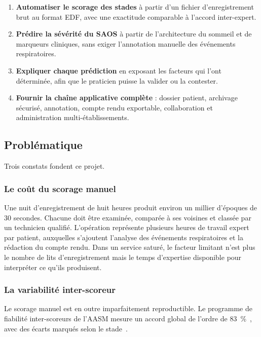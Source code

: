 \begin{enumerate}[itemsep=3pt,topsep=4pt]
  \item \textbf{Automatiser le scorage des stades} à partir d'un fichier
        d'enregistrement brut au format EDF, avec une exactitude comparable à l'accord
        inter-expert.
  \item \textbf{Prédire la sévérité du SAOS} à partir de l'architecture du sommeil et
        de marqueurs cliniques, sans exiger l'annotation manuelle des événements
        respiratoires.
  \item \textbf{Expliquer chaque prédiction} en exposant les facteurs qui l'ont
        déterminée, afin que le praticien puisse la valider ou la contester.
  \item \textbf{Fournir la chaîne applicative complète} : dossier patient, archivage
        sécurisé, annotation, compte rendu exportable, collaboration et administration
        multi-établissements.
\end{enumerate}

\subsection{Problématique}

Trois constats fondent ce projet.

\subsubsection{Le coût du scorage manuel}

Une nuit d'enregistrement de huit heures produit environ un millier d'époques de
30 secondes. Chacune doit être examinée, comparée à ses voisines et classée par un
technicien qualifié. L'opération représente plusieurs heures de travail expert par
patient, auxquelles s'ajoutent l'analyse des événements respiratoires et la rédaction du
compte rendu. Dans un service saturé, le facteur limitant n'est plus le nombre de lits
d'enregistrement mais le temps d'expertise disponible pour interpréter ce qu'ils
produisent.

\subsubsection{La variabilité inter-scoreur}

Le scorage manuel est en outre imparfaitement reproductible. Le programme de fiabilité
inter-scoreurs de l'AASM mesure un accord
global de l'ordre de \SI{83}{\percent}~\cite{rosenberg2013}, avec des écarts marqués
selon le stade~\cite{danker2009}.

